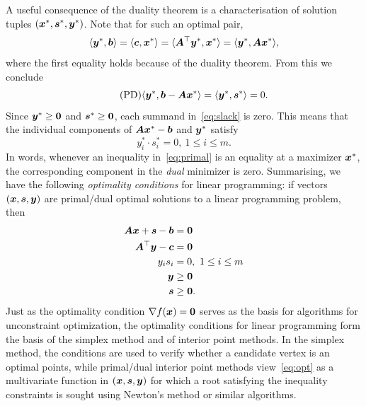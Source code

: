 A useful consequence of the duality theorem is a characterisation of solution tuples $(\bm{x}^*,\bm{s}^*,\bm{y}^*)$. Note that for such an optimal pair,
\begin{equation*}
 \langle {\bm{y}^*}, {\bm{b}} \rangle = \langle {\bm{c}}, {\bm{x}^*} \rangle = \langle {\bm{A}^{\top}\bm{y}^*}, {\bm{x}^*} \rangle = \langle {\bm{y}^*}, {\bm{A}\bm{x}^*} \rangle,
\end{equation*}
where the first equality holds because of the duality theorem. From this we conclude
\begin{equation}\label{eq:slack}\tag{PD}
 \langle {\bm{y}^*}, {\bm{b}-\bm{A}\bm{x}^*} \rangle=\langle {\bm{y}^*}, {\bm{s}^*} \rangle=0.
\end{equation}
Since $\bm{y}^*\geq \bm{0}$ and $\bm{s}^*\geq \bm{0}$, each summand in~\eqref{eq:slack} is zero. This means that the individual components of $\bm{A}\bm{x}^*-\bm{b}$ and $\bm{y}^*$ satisfy
\begin{equation*}
 y^*_i \cdot s^*_i = 0, \ 1\leq i\leq m.
\end{equation*}
In words, whenever an inequality in~\eqref{eq:primal} is an equality at a maximizer $\bm{x}^*$, the corresponding component in the {\em dual} minimizer is zero.
Summarising, we have the following {\em optimality conditions} for linear programming:
if vectors $(\bm{x},\bm{s},\bm{y})$ are primal/dual optimal solutions to a linear programming problem, then
\begin{align}\label{eq:opt}
\begin{split}
 \bm{A}\bm{x}+\bm{s}-\bm{b} & = \bm{0}\\
 \bm{A}^{\top}\bm{y}-\bm{c} & = \bm{0}\\
 y_is_i &= 0, \ 1\leq i\leq m\\
 \bm{y}& \geq \bm{0}\\
 \bm{s}& \geq \bm{0}.
 \end{split}
\end{align}
Just as the optimality condition $\nabla f(\bm{x})=\bm{0}$ serves as the basis for algorithms for unconstraint optimization, the optimality conditions for linear programming form the basis of the simplex method and of interior point methods. In the simplex method, the conditions are used to verify whether a candidate vertex is an optimal points, while primal/dual interior point methods view~\eqref{eq:opt} as a multivariate function in $(\bm{x},\bm{s},\bm{y})$ for which a root satisfying the inequality constraints is sought using Newton's method or similar algorithms.


